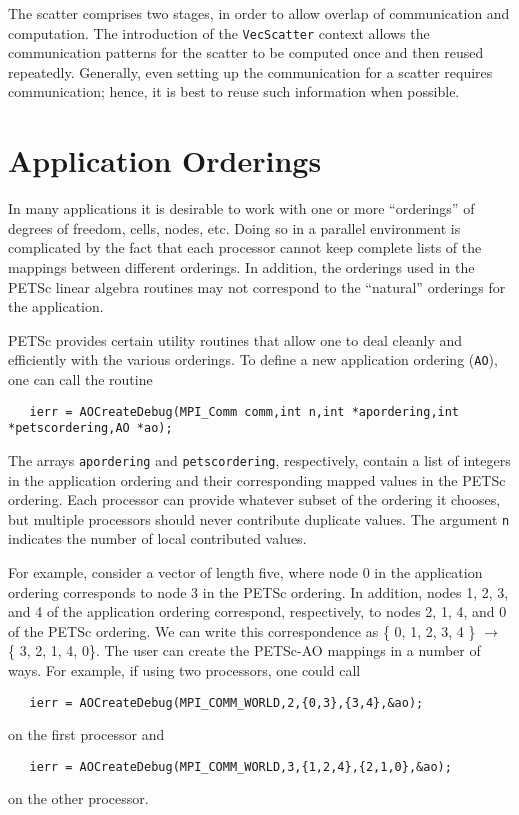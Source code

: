 The scatter comprises two stages, in order to allow overlap of 
communication and computation. The introduction of the 
{\tt VecScatter} context allows the communication patterns for the scatter
to be computed once and then reused repeatedly. Generally, even 
setting up the communication for a scatter requires communication; 
hence, it is best to reuse such information when possible.

\section{Application Orderings}
\label{sec:ao}
 

In many applications it is desirable to work with one or more ``orderings''
of degrees of freedom, cells, nodes, etc.  Doing so in a parallel environment is
complicated by the fact that each processor cannot keep 
complete lists of the mappings between different orderings. In addition, 
the orderings used in the PETSc linear algebra routines may not correspond to the 
``natural'' orderings for the application.

PETSc provides certain utility routines that allow one to deal cleanly
and efficiently with the various orderings. To define a new application ordering
({\tt AO}), one can call the routine 
\begin{verbatim}
   ierr = AOCreateDebug(MPI_Comm comm,int n,int *apordering,int *petscordering,AO *ao);
\end{verbatim}
The  
arrays {\tt apordering} and {\tt petscordering}, respectively, contain a list of integers
in the application ordering and their corresponding mapped values in the PETSc 
ordering. Each processor can provide whatever subset of the ordering it 
chooses, but multiple processors should never contribute duplicate values. 
The argument {\tt n} indicates the number of local contributed values.

For example, consider a vector of length five, where node 0 in the application ordering
corresponds to node 3 in the PETSc ordering.  In addition, nodes 1, 2, 3, and 4 of
the application ordering correspond, respectively, to nodes 2, 1, 4, and 0 of
the PETSc ordering.
We can write this correspondence as \{ 0, 1, 2, 3, 4 \} $ \rightarrow $ \{ 3, 2, 1, 4, 0\}. 
The user can create the PETSc-AO mappings in a number of ways.  For example,
if using two processors, one could call
\begin{verbatim}
   ierr = AOCreateDebug(MPI_COMM_WORLD,2,{0,3},{3,4},&ao);
\end{verbatim}
on the first processor and 
\begin{verbatim}
   ierr = AOCreateDebug(MPI_COMM_WORLD,3,{1,2,4},{2,1,0},&ao);
\end{verbatim}
on the other processor.

